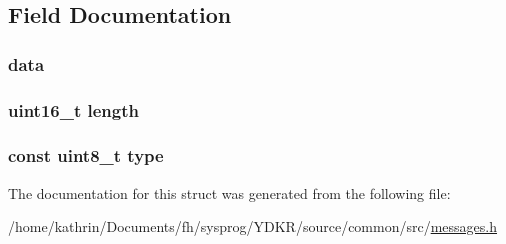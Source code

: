 \subsection{Field Documentation}
\hypertarget{structquestion_a17a102c002c052d9c66ef8eee24429d7}{
\subsubsection[{data}]{ {\bf data}}}
\label{structquestion_a17a102c002c052d9c66ef8eee24429d7}
\hypertarget{structquestion_a1892eba2086d12ac2b09005aeb09ea3b}{
\subsubsection[{length}]{\setlength{\rightskip}{0pt plus 5cm}uint16\_\-t {\bf length}}}
\label{structquestion_a1892eba2086d12ac2b09005aeb09ea3b}
\hypertarget{structquestion_aca7dafb0092715a03dd40f45fc607f2a}{
\subsubsection[{type}]{\setlength{\rightskip}{0pt plus 5cm}const uint8\_\-t {\bf type}}}
\label{structquestion_aca7dafb0092715a03dd40f45fc607f2a}


The documentation for this struct was generated from the following file:\begin{DoxyCompactItemize}
\item 
/home/kathrin/Documents/fh/sysprog/YDKR/source/common/src/\hyperlink{messages_8h}{messages.h}\end{DoxyCompactItemize}
